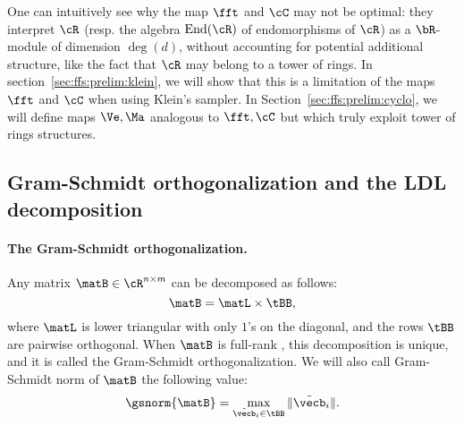 One can intuitively see why the map $\fft$ and $\cC$ may not be optimal: they interpret $\cR$ (resp. the algebra $\text{End}(\cR)$ of endomorphisms of $\cR$) as a $\bR$-module of dimension $\deg(d)$, without accounting for potential additional structure, like the fact that $\cR$ may belong to a tower of rings. In section~\ref{sec:ffs:prelim:klein}, we will show that this is a limitation of the maps $\fft$ and $\cC$ when using Klein's sampler. In Section~\ref{sec:ffs:prelim:cyclo}, we will define maps $\Ve,\Ma$ analogous to $\fft,\cC$ but which truly exploit tower of rings structures.



\subsection{Gram-Schmidt orthogonalization and the LDL decomposition}\label{sec:ffs:prelim:gso}

%
%

\paragraph{The Gram-Schmidt orthogonalization.}
Any matrix $\matB \in \cR^{n \times m}$ can be decomposed as follows:
\begin{equation}
 \matB = \matL \times \tBB,
\end{equation}
where $\matL$ is lower triangular with only $1$'s on the diagonal, and the rows $\tBB$ are pairwise orthogonal. When $\matB$ is full-rank , this decomposition is unique, and it is called the Gram-Schmidt orthogonalization.
We will also call Gram-Schmidt norm of $\matB$ the following value:
\begin{equation}
 \gsnorm{\matB} = \max_{\tilde\vecb_i \in \tBB} \|\tilde\vecb_i\|.
\end{equation}

